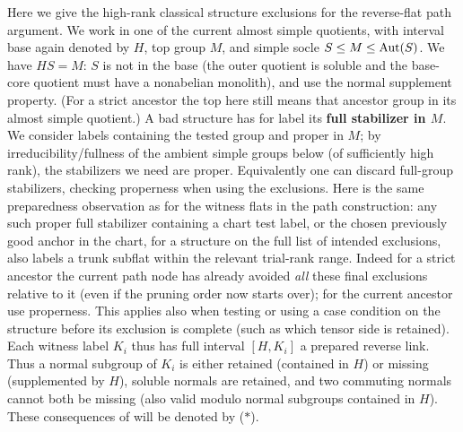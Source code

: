 \begin{convention}\label{c:classical-configuration}
Here we give the high-rank classical structure exclusions for the reverse-flat path argument. We work in one of the current almost simple quotients, with interval base again denoted by \(H\), top group \(M\), and simple socle \(S\le M\le{\rm Aut}(S)\). We have \(HS=M\): \(S\) is not in the base (the outer quotient is soluble and the base-core quotient must have a nonabelian monolith), and use the normal supplement property. (For a strict ancestor the top here still means that ancestor group in its almost simple quotient.) A bad structure has for label its \textbf{full stabilizer in \(M\)}. We consider labels containing the tested group and proper in \(M\); by irreducibility/fullness of the ambient simple groups below (of sufficiently high rank), the stabilizers we need are proper. Equivalently one can discard full-group stabilizers, checking properness when using the exclusions. Here is the same preparedness observation as for the witness flats in the path construction: any such proper full stabilizer containing a chart test label, or the chosen previously good anchor in the chart, for a structure on the full list of intended exclusions, also labels a trunk subflat within the relevant trial-rank range. Indeed for a strict ancestor the current path node has already avoided \emph{all} these final exclusions relative to it (even if the pruning order now starts over); for the current ancestor use properness. This applies also when testing or using a case condition on the structure before its exclusion is complete (such as which tensor side is retained). Each witness label \(K_i\) thus has full interval \([H,K_i]\) a prepared reverse link. Thus a normal subgroup of \(K_i\) is either retained (contained in \(H\)) or missing (supplemented by \(H\)), soluble normals are retained, and two commuting normals cannot both be missing (also valid modulo normal subgroups contained in \(H\)). These consequences of  will be denoted by (\(*\)).


\end{convention}
